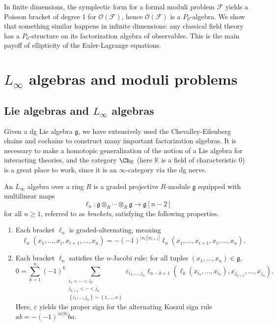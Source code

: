 In finite dimensions, the symplectic form for a formal moduli problem $\mathcal{F} $ yields a Poisson bracket of degree 1 for $\mathcal{O} (\mathcal{F} )$, hence $\mathcal{O} (\mathcal{F} )$ is a $P_0$-algebra. We show that something similar happens in infinite dimensions: any classical field theory has a $P_0$-structure on its factorization algebra of observables. This is the main payoff of ellipticity of the Euler-Lagrange equations.

\chapter{$L_\infty $ algebras and moduli problems}

\section{Lie algebras and $L_\infty $ algebras}

Given a dg Lie algebra $\mathfrak{g} $, we have extensively used the Chevalley-Eilenberg chains and cochains to construct many important factorization algebras. It is necessary to make a homotopic generalization of the notion of a Lie algebra for interacting theories, and the category $\Ch_{\mathbb{K} } $ (here $\mathbb{K}$ is a field of characteristic 0) is a great place to work, since it is an $\infty $-category via the dg nerve.

\begin{definition}\label{dfn:10-1-1}
	An $L_\infty $ algebra over a ring $R$ is a graded projective $R$-module $\mathfrak{g} $ equipped with multilinear maps
	\[
		\ell_n : \mathfrak{g} \otimes_R \cdots \otimes _R \mathfrak{g}  \to \mathfrak{g} [n-2]
	\]
	for all $n\geq 1$, referred to as \emph{brackets}, satisfying the following properties.
	\begin{enumerate}
		\item Each bracket $\ell _n$ is graded-alternating, meaning
			\[
				\ell _n(x_1, \ldots ,x_i,x_{i+1} ,\ldots ,x_n) = -(-1)^{\left| x_i \right| \left| x_{i+1}  \right| } \ell _n(x_1, \ldots , x_{i+1} ,x_i, \ldots ,x_n)
			.\]
		\item Each bracket $\ell _n$ satisfies the $n$-Jacobi rule: for all tuples $(x_1, \ldots , x_n)\in \mathfrak{g} $,
			\[
				0=\sum_{k=1}^{n} (-1)^k \sum_{\substack{i_1 < \cdots < i_k \\ j_{k+1} < \cdots < j_n \\ \left\{ i_1, \ldots , j_n \right\} =\left\{ 1, \ldots ,n \right\} }} \varepsilon_{i_1, \ldots ,j_n} \ell _{n-k+1} (\ell _k(x_{i_1} , \ldots ,x_{i_k} ), x_{j_{k+1} } , \ldots , x_{j_n} )
			.\]
			Here, $\varepsilon $ yields the proper sign for the alternating Koszul sign rule $ab=-(-1)^{\left| a \right| \left| b \right| } ba$.
	\end{enumerate}	
\end{definition}

